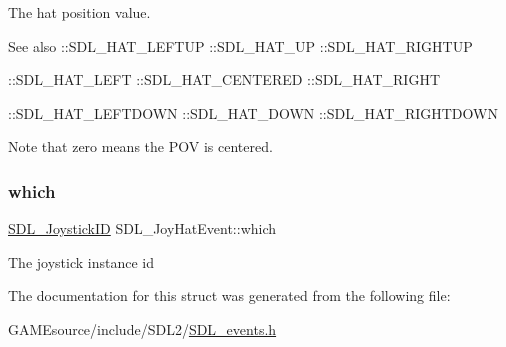 The hat position value. \begin{DoxySeeAlso}{See also}
\+::\+S\+D\+L\+\_\+\+H\+A\+T\+\_\+\+L\+E\+F\+T\+UP \+::\+S\+D\+L\+\_\+\+H\+A\+T\+\_\+\+UP \+::\+S\+D\+L\+\_\+\+H\+A\+T\+\_\+\+R\+I\+G\+H\+T\+UP 

\+::\+S\+D\+L\+\_\+\+H\+A\+T\+\_\+\+L\+E\+FT \+::\+S\+D\+L\+\_\+\+H\+A\+T\+\_\+\+C\+E\+N\+T\+E\+R\+ED \+::\+S\+D\+L\+\_\+\+H\+A\+T\+\_\+\+R\+I\+G\+HT 

\+::\+S\+D\+L\+\_\+\+H\+A\+T\+\_\+\+L\+E\+F\+T\+D\+O\+WN \+::\+S\+D\+L\+\_\+\+H\+A\+T\+\_\+\+D\+O\+WN \+::\+S\+D\+L\+\_\+\+H\+A\+T\+\_\+\+R\+I\+G\+H\+T\+D\+O\+WN
\end{DoxySeeAlso}
Note that zero means the P\+OV is centered. \mbox{\label{struct_s_d_l___joy_hat_event_ac9d9bb179f9116d16b3da47cacd74b55}} 
\subsubsection{\texorpdfstring{which}{which}}
{\footnotesize\ttfamily \mbox{\hyperlink{_s_d_l__joystick_8h_a3c3d32500cb08f76ee8077983912c0bd}{S\+D\+L\+\_\+\+Joystick\+ID}} S\+D\+L\+\_\+\+Joy\+Hat\+Event\+::which}

The joystick instance id 

The documentation for this struct was generated from the following file\+:\begin{DoxyCompactItemize}
\item 
G\+A\+M\+Esource/include/\+S\+D\+L2/\mbox{\hyperlink{_s_d_l__events_8h}{S\+D\+L\+\_\+events.\+h}}\end{DoxyCompactItemize}

